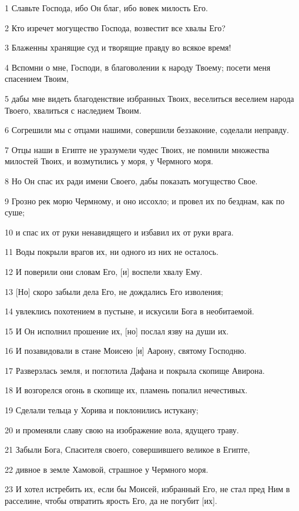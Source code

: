 \par 1 Славьте Господа, ибо Он благ, ибо вовек милость Его.
\par 2 Кто изречет могущество Господа, возвестит все хвалы Его?
\par 3 Блаженны хранящие суд и творящие правду во всякое время!
\par 4 Вспомни о мне, Господи, в благоволении к народу Твоему; посети меня спасением Твоим,
\par 5 дабы мне видеть благоденствие избранных Твоих, веселиться веселием народа Твоего, хвалиться с наследием Твоим.
\par 6 Согрешили мы с отцами нашими, совершили беззаконие, соделали неправду.
\par 7 Отцы наши в Египте не уразумели чудес Твоих, не помнили множества милостей Твоих, и возмутились у моря, у Чермного моря.
\par 8 Но Он спас их ради имени Своего, дабы показать могущество Свое.
\par 9 Грозно рек морю Чермному, и оно иссохло; и провел их по безднам, как по суше;
\par 10 и спас их от руки ненавидящего и избавил их от руки врага.
\par 11 Воды покрыли врагов их, ни одного из них не осталось.
\par 12 И поверили они словам Его, [и] воспели хвалу Ему.
\par 13 [Но] скоро забыли дела Его, не дождались Его изволения;
\par 14 увлеклись похотением в пустыне, и искусили Бога в необитаемой.
\par 15 И Он исполнил прошение их, [но] послал язву на души их.
\par 16 И позавидовали в стане Моисею [и] Аарону, святому Господню.
\par 17 Разверзлась земля, и поглотила Дафана и покрыла скопище Авирона.
\par 18 И возгорелся огонь в скопище их, пламень попалил нечестивых.
\par 19 Сделали тельца у Хорива и поклонились истукану;
\par 20 и променяли славу свою на изображение вола, ядущего траву.
\par 21 Забыли Бога, Спасителя своего, совершившего великое в Египте,
\par 22 дивное в земле Хамовой, страшное у Чермного моря.
\par 23 И хотел истребить их, если бы Моисей, избранный Его, не стал пред Ним в расселине, чтобы отвратить ярость Его, да не погубит [их].
